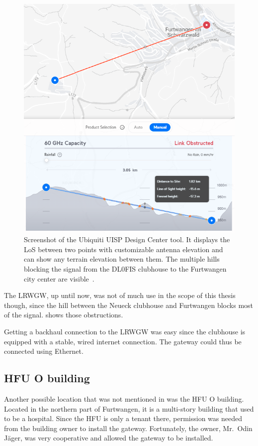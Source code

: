 \begin{figure}[htbp]
    \centering
    \includegraphics[width=.6\textwidth]{pictures/hardware/gateway-deployment/line-of-sight-dl0fis.png}
    \caption[\acl{LoS} between the DL0FIS clubhouse and the Furtwangen city center]{
        Screenshot of the Ubiquiti UISP Design Center tool.
        It displays the \ac{LoS} between two points with customizable antenna elevation and can show any terrain elevation between them.
        The multiple hills blocking the signal from the DL0FIS clubhouse to the Furtwangen city center are visible~\cite{ubiquiti_inc_uisp_2023}.
    }\label{pic:dl0fis_gw_los}
\end{figure}
    
The \acl{LRWGW}, up until now, was not of much use in the scope of this thesis though, since the hill between the Neueck clubhouse and Furtwangen blocks most of the signal.
 shows those obstructions.

Getting a backhaul connection to the \acl{LRWGW} was easy since the clubhouse is equipped with a stable, wired internet connection.
The gateway could thus be connected using Ethernet.

\subsection{\acl{HFU} O building}\label{subsec:conclusion-hfu-o-building}

Another possible location that was not mentioned in  was the \ac{HFU} O building.
Located in the northern part of Furtwangen, it is a multi-story building that used to be a hospital.
Since the \ac{HFU} is only a tenant there, permission was needed from the building owner to install the gateway.
Fortunately, the owner, Mr.\ Odin Jäger, was very cooperative and allowed the gateway to be installed.

